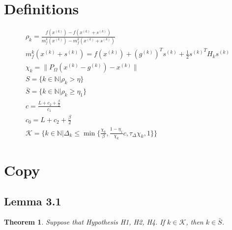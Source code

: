 \documentclass{article}
\newtheorem{theorem}{Theorem}
\newcommand{\xk}{{x}^{(k)}}
\newcommand{\ints}{\mathbb N}
\newcommand{\dk}{\Delta_k}
\newcommand{\rk}{\rho_k}
\newcommand{\pik}{\chi_k}
\newcommand{\sk}{{s^{(k)}}}
\newcommand{\mk}{{m_f^{k}}}
\newcommand{\gk}{{g^{(k)}}}
\newcommand{\oalpha}{\tau_{\Delta}}
\begin{document}
\section{Definitions}

\begin{align*}
\rk = \frac{f(\xk) - f(\xk + \sk)}{\mk(\xk) - \mk(\xk + \sk)} \\
\mk(\xk + \sk) = f(\xk) + (\gk)^T \sk + \frac 1 2 \sk^T H_k \sk \\
\pik = \|P_{\Omega}(\xk - \gk) - \xk \| \\
S = \{k \in \ints | \rk > \eta \} \\
\bar{S} = \{k \in \ints | \rk \ge \eta_1 \} \\
c = \frac{L + c_2 + \frac {\beta} 2}{c_1} \\
c_0 = L + c_2 + \frac {\beta} 2 \\
\mathcal K = \big \{ k \in \ints | \dk \le \min \{ \frac {\pik}{\beta}, \frac{1-\eta_1}{\pik}c, \oalpha \pik, 1 \} \big \}
\end{align*}

\section{Copy}

\subsection{Lemma 3.1}
\begin{theorem}
Suppose that Hypothesis H1, H2, H4. If $k \in \mathcal K$, then $k \in \bar{S}$.
\end{theorem}
 
\end{document}
